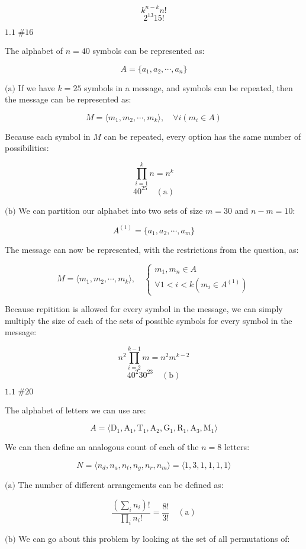 \documentclass{article}
\newcommand{\problem}[2]{$\boxed{\text{#1 \##2}}$}
\newcommand{\subproblem}[1]{$\boxed{\text{(#1)}}$}
\newcommand{\subsolution}[2]{\boxed{#2\quad(\text{#1})}}
\newcommand{\solution}[1]{\boxed{#1}}
\begin{document}
\begin{multicols*}{2}
\[
k^{n-k}n!
\] \[
\solution{2^{13}15!}
\]


%
\problem{1.1}{16}

The alphabet of $n=40$ symbols can be represented as:

\[
A=\{a_1,a_2,\cdots,a_n\}
\]

%
\subproblem{a} If we have $k=25$ symbols in a message, and symbols can
be repeated, then the message can be represented as:

\[
M=\langle m_1,m_2,\cdots,m_k\rangle,\quad \forall i(m_i\in A)
\]

Because each symbol in $M$ can be repeated, every option has the same
number of possibilities:

\[
\prod\limits_{i=1}^k n=n^k
\] \[
\subsolution{a}{40^{25}}
\]

\subproblem{b} We can partition our alphabet into two sets of size
$m=30$ and $n-m=10$:

\[
A^{(1)}=\{a_1,a_2,\cdots,a_m\}
\]

The message can now be represented, with the restrictions from the
question, as:

\[
M=\langle m_1,m_2,\cdots,m_k\rangle,\quad\begin{cases}m_1,m_n\in A \\ \forall 1<i<k(m_i\in A^{(1)})\end{cases}
\]

Because repitition is allowed for every symbol in the message, we can
simply multiply the size of each of the sets of possible symbols for
every symbol in the message:

\[
n^2\prod\limits_{i=2}^{k-1} m=n^2m^{k-2}
\] \[
\subsolution{b}{40^2 30^{23}}
\]

%
\problem{1.1}{20}

The alphabet of letters we can use are:

\[
A=\langle
\text{D}_1,
\text{A}_1,
\text{T}_1,
\text{A}_2,
\text{G}_1,
\text{R}_1,
\text{A}_3,
\text{M}_1
\rangle
\]

We can then define an analogous count of each of the $n=8$ letters:

\[
N=\langle n_d,n_a,n_t,n_g,n_r,n_m\rangle=\langle 1,3,1,1,1,1\rangle
\]

%
\subproblem{a} The number of different arrangements can be defined as:

\[
\subsolution{a}{\dfrac{\left(\sum\limits_i n_i\right)!}{\prod\limits_i n_i!}=\dfrac{8!}{3!}}
\]

%
\subproblem{b} We can go about this problem by looking at the set of
all permutations of:


\end{multicols*}
\end{document}
